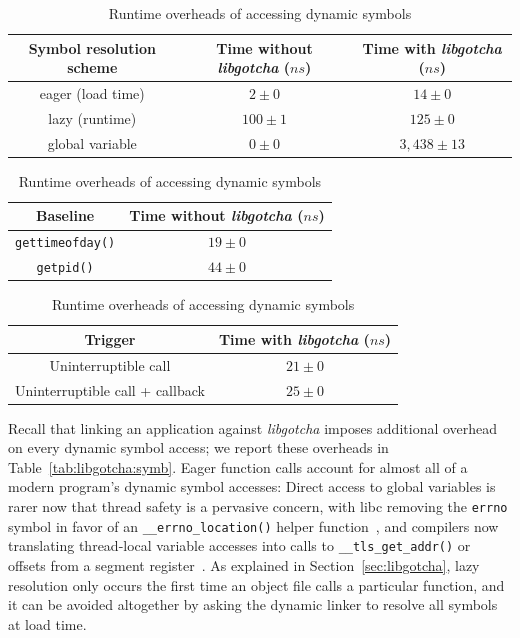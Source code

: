

\begin{table}
	\begin{minipage}{2\columnwidth}
	\centering
	\begin{tabular}{c | c c}
	Symbol resolution scheme & Time without \textit{libgotcha} ($ns$) & Time with \textit{libgotcha} ($ns$) \\
	\hline
	eager (load time) & $2 \pm 0$ & $14 \pm 0$ \\
	lazy (runtime) & $100 \pm 1$ & $125 \pm 0$ \\
	global variable & $0 \pm 0$ & $3,438 \pm 13$
	\end{tabular}
	\label{tab:libgotcha:symb}
	\end{minipage}

	\begin{minipage}{\columnwidth}
	\centering
	\begin{tabular}{c | c}
	Baseline & Time without \textit{libgotcha} ($ns$) \\
	\hline
	\texttt{gettimeofday()} & $19 \pm 0$ \\
	\texttt{getpid()} & $44 \pm 0$
	\end{tabular}
	\label{tab:libgotcha:baseline}
	\end{minipage}
%
	\begin{minipage}{\columnwidth}
	\centering
	\begin{tabular}{c | c}
	Trigger & Time with \textit{libgotcha} ($ns$) \\
	\hline
	Uninterruptible call & $21 \pm 0$ \\
	Uninterruptible call + callback & $25 \pm 0$
	\end{tabular}
	\label{tab:libgotcha:whitelist}
	\end{minipage}
\caption{Runtime overheads of accessing dynamic symbols}
\end{table}

Recall that linking an application against \textit{libgotcha} imposes additional
overhead on every dynamic symbol access; we report these overheads in
Table~\ref{tab:libgotcha:symb}.  Eager function calls account for almost all of a
modern program's dynamic symbol accesses:  Direct access to global variables is rarer
now that thread safety is a pervasive concern, with libc removing the \texttt{errno}
symbol in favor of an \texttt{\_\_errno\_location()} helper
function~\cite{www-lsb-errno}, and compilers now translating thread-local variable
accesses into calls to \texttt{\_\_tls\_get\_addr()} or offsets from a segment
register~\cite{drepper:spec2013}.  As explained in Section~\ref{sec:libgotcha}, lazy
resolution only occurs the first time an object file calls a particular function, and
it can be avoided altogether by asking the dynamic linker to resolve all symbols at
load time.


